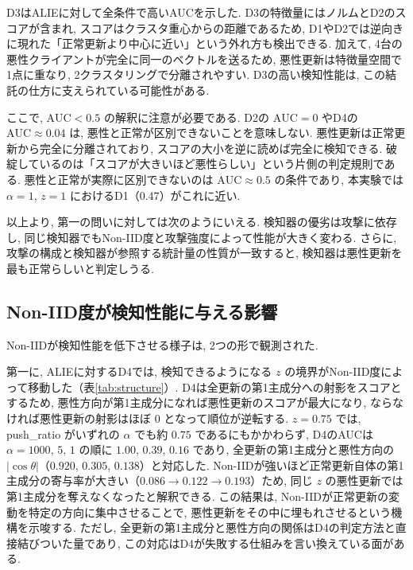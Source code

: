 \documentclass[a4j, twocolumn, dvipdfmx]{jsarticle}
\newcommand{\PushRatio}{\textrm{push\_ratio}}
\begin{document}
D3はALIEに対して全条件で高いAUCを示した. D3の特徴量にはノルムとD2のスコアが含まれ, スコアはクラスタ重心からの距離であるため, D1やD2では逆向きに現れた「正常更新より中心に近い」という外れ方も検出できる. 加えて, 4台の悪性クライアントが完全に同一のベクトルを送るため, 悪性更新は特徴量空間で1点に重なり, 2クラスタリングで分離されやすい. D3の高い検知性能は, この結託の仕方に支えられている可能性がある.

ここで, $\mathrm{AUC}<0.5$ の解釈に注意が必要である. D2の $\mathrm{AUC}=0$ やD4の $\mathrm{AUC} \approx 0.04$ は, 悪性と正常が区別できないことを意味しない. 悪性更新は正常更新から完全に分離されており, スコアの大小を逆に読めば完全に検知できる. 破綻しているのは「スコアが大きいほど悪性らしい」という片側の判定規則である. 悪性と正常が実際に区別できないのは $\mathrm{AUC} \approx 0.5$ の条件であり, 本実験では $\alpha=1$, $z=1$ におけるD1（$0.47$）がこれに近い.

以上より, 第一の問いに対しては次のようにいえる. 検知器の優劣は攻撃に依存し, 同じ検知器でもNon-IID度と攻撃強度によって性能が大きく変わる. さらに, 攻撃の構成と検知器が参照する統計量の性質が一致すると, 検知器は悪性更新を最も正常らしいと判定しうる.

\subsection{Non-IID度が検知性能に与える影響}
\label{sec:disc-noniid}

Non-IIDが検知性能を低下させる様子は, 2つの形で観測された.

第一に, ALIEに対するD4では, 検知できるようになる $z$ の境界がNon-IID度によって移動した（表\ref{tab:structure}）. D4は全更新の第1主成分への射影をスコアとするため, 悪性方向が第1主成分になれば悪性更新のスコアが最大になり, ならなければ悪性更新の射影はほぼ $0$ となって順位が逆転する. $z=0.75$ では, \PushRatio{} がいずれの $\alpha$ でも約 $0.75$ であるにもかかわらず, D4のAUCは $\alpha=1000,\,5,\,1$ の順に $1.00$, $0.39$, $0.16$ であり, 全更新の第1主成分と悪性方向の $|\cos\theta|$（$0.920$, $0.305$, $0.138$）と対応した. Non-IIDが強いほど正常更新自体の第1主成分の寄与率が大きい（$0.086 \to 0.122 \to 0.193$）ため, 同じ $z$ の悪性更新では第1主成分を奪えなくなったと解釈できる. この結果は, Non-IIDが正常更新の変動を特定の方向に集中させることで, 悪性更新をその中に埋もれさせるという機構を示唆する. ただし, 全更新の第1主成分と悪性方向の関係はD4の判定方法と直接結びついた量であり, この対応はD4が失敗する仕組みを言い換えている面がある. 
\end{document}
